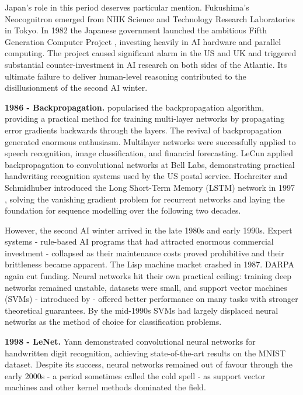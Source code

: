 Japan's role in this period deserves particular mention. Fukushima's Neocognitron emerged from NHK Science and Technology Research Laboratories in Tokyo. In 1982 the Japanese government launched the ambitious Fifth Generation Computer Project \cite{fgcs1982}, investing heavily in AI hardware and parallel computing. The project caused significant alarm in the US and UK and triggered substantial counter-investment in AI research on both sides of the Atlantic. Its ultimate failure to deliver human-level reasoning contributed to the disillusionment of the second AI winter.

\textbf{1986 - Backpropagation.} \cite{rumelhart1986backprop} popularised the backpropagation algorithm, providing a practical method for training multi-layer networks by propagating error gradients backwards through the layers. The revival of backpropagation generated enormous enthusiasm. Multilayer networks were successfully applied to speech recognition, image classification, and financial forecasting. LeCun applied backpropagation to convolutional networks at Bell Labs, demonstrating practical handwriting recognition systems used by the US postal service. Hochreiter and Schmidhuber introduced the Long Short-Term Memory (LSTM) network in 1997 \cite{hochreiter1997lstm}, solving the vanishing gradient problem for recurrent networks and laying the foundation for sequence modelling over the following two decades.

However, the second AI winter arrived in the late 1980s and early 1990s. Expert systems - rule-based AI programs that had attracted enormous commercial investment - collapsed as their maintenance costs proved prohibitive and their brittleness became apparent. The Lisp machine market crashed in 1987. DARPA again cut funding. Neural networks hit their own practical ceiling: training deep networks remained unstable, datasets were small, and support vector machines (SVMs) - introduced by \cite{vapnik1995svm} - offered better performance on many tasks with stronger theoretical guarantees. By the mid-1990s SVMs had largely displaced neural networks as the method of choice for classification problems.

\textbf{1998 - LeNet.} Yann \cite{lecun1998gradient} demonstrated convolutional neural networks for handwritten digit recognition, achieving state-of-the-art results on the MNIST dataset. Despite its success, neural networks remained out of favour through the early 2000s - a period sometimes called the cold spell - as support vector machines and other kernel methods dominated the field.

